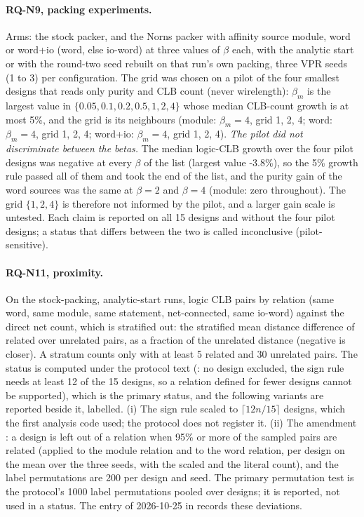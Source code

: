 \paragraph{RQ-N9, packing experiments.} Arms: the stock packer, and the Norns packer with affinity source module,
word or word+io (word, else io-word) at three values of $\beta$ each, with the analytic start or with the round-two
 seed rebuilt on that run's own packing, three VPR seeds (1 to 3) per configuration. The grid was
chosen on a pilot of the four smallest designs that reads only purity and CLB count (never wirelength): $\beta_m$ is
the largest value in $\{0.05,0.1,0.2,0.5,1,2,4\}$ whose median CLB-count growth is at most 5\%, and the grid is its
neighbours (module: $\beta_m=4$, grid {1, 2, 4}; word: $\beta_m=4$, grid {1, 2, 4}; word+io: $\beta_m=4$, grid {1, 2, 4}). \emph{The pilot did not discriminate between the betas.} The median logic-CLB growth over the
four pilot designs was negative at every $\beta$ of the list (largest value -3.8\%), so the 5\% growth rule passed
all of them and took the end of the list, and the purity gain of the word sources was the same at $\beta=2$ and $\beta=4$
(module: zero throughout). The grid $\{1,2,4\}$ is therefore not informed by the pilot, and a larger gain scale is untested. Each claim is reported on all 15 designs and without the four pilot designs; a status
that differs between the two is called inconclusive (pilot-sensitive).

\paragraph{RQ-N11, proximity.} On the stock-packing, analytic-start runs, logic CLB pairs by relation (same word,
same module, same statement, net-connected, same io-word) against the direct net count, which is stratified
out: the stratified mean distance difference of related over unrelated pairs, as a fraction of the unrelated
distance (negative is closer). A stratum counts only with at least 5 related and 30 unrelated pairs. The status
is computed under the protocol text (: no design excluded, the sign rule needs at least 12 of the 15
designs, so a relation defined for fewer designs cannot be supported), which is the primary status, and the
following variants are reported beside it, labelled. (i) The sign rule scaled to $\lceil 12n/15\rceil$ designs, which the
first analysis code used; the protocol does not register it. (ii) The amendment : a design is
left out of a relation when 95\% or more of the sampled pairs are related (applied to the module relation and to
the word relation, per design on the mean over the three seeds, with the scaled and the literal count), and the
label permutations are 200 per design and seed. The primary permutation test is the protocol's 1000 label permutations pooled
over designs; it is reported, not used in a status. The entry of 2026-10-25 in  records these deviations.

